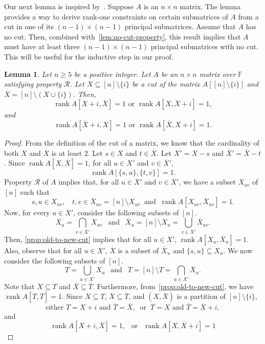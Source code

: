 \documentclass[11pt,letterpaper]{article}
\DeclareMathOperator*{\rank}{rank}
\newcommand{\comp}[1]{\overline{#1}}
\newcommand{\F}{\mathbb{F}}
\newtheorem{lemma}{Lemma}[section]
\newcommand{\nsubset}[1]{[n]\setminus\{#1\}}
\newcommand{\prop}{\mathcal{R}}
\begin{document}
{{{Our next lemma is inspired by~\cite[Lemma~6]{Loewy86}. Suppose $A$ is an $n \times n$ matrix. The lemma provides a way to derive rank-one constraints on certain submatrices of $A$ from a cut in one of its $(n-1) \times (n-1)$ principal submatrices. Assume that $A$ has no cut. Then, combined with~\cref{lem:no-cut-property}, this result implies that $A$ must have at least three $(n-1) \times (n-1)$ principal submatrices with no cut. This will be useful for the inductive step in our proof.
\begin{lemma}
\label{lem:lift-of-cut}
Let $n\geq 5$ be a positive integer. Let $A$ be an $n\times n$ matrix over $\F$ satisfying property $\prop$. Let $X\subseteq [n]\setminus\{i\}$ be a cut of the matrix $A[\nsubset{i}]$ and $\comp{X}=[n]\setminus (X\cup\{i\})$. Then, $$\rank A[X+i,  \comp{X}]=1 \text{ or } \rank A[X,  \comp{X}+i]=1,$$ and $$\rank A[\comp{X}+i,  X]=1 \text{ or } \rank A[\comp{X},  X+i]=1.$$
\end{lemma}
\begin{proof}
From the definition of the cut of a matrix, we know that the cardinality of both $X$ and $\comp{X}$ is at least $2$. Let $s\in X$ and $t\in \comp{X}$. Let $X'=X-s$ and $\comp{X}'=\comp{X}-t$. Since $\rank A[X, \comp{X}]=1$, for all $u\in X'$ and $v\in\comp{X}'$, $$\rank A[\{s, u\}, \{t, v\}]=1.$$ Property $\prop$ of $A$ implies that, for all $u\in X'$ and $v\in\comp{X}'$, we have a subset $X_{uv}$ of $[n]$ such that $$s, u\in X_{uv},\ \ \ \  t, v\in \comp X_{uv}=[n]\setminus X_{uv}\  \text{ and }\ \rank A[X_{uv}, \comp X_{uv}]=1.$$ Now, for every $u\in X'$, consider the following subsets of $[n]$. $$X_u=\bigcap_{v\in \comp{X}'}X_{uv}\ \ \text{ and }\ \ \comp{X}_u=[n]\setminus X_u=\bigcup_{v\in \comp{X}'} \comp{X}_{uv}.$$ Then, \cref{prop:old-to-new-cut} implies that for all $u\in X'$, $\rank A[X_u, \comp{X}_u]=1$. Also, observe that for all $u\in X'$, $\comp{X}$ is a subset of $\comp{X}_u$ and $\{s,u\}\subseteq X_u$. We now consider the following subsets of $[n]$. $$T=\bigcup_{u\in X'}X_u \ \ \text{ and }\ \ \comp{T}=[n]\setminus T=\bigcap_{u\in X'}\comp{X}_u.$$ Note that $X\subseteq T$ and $\comp{X}\subseteq \comp{T}$. Furthermore, from~\cref{prop:old-to-new-cut}, we have $\rank A[T, \comp T]=1$. Since $X\subseteq T$, $\comp{X}\subseteq \comp{T}$, and $(X, \comp{X})$ is a partition of $\nsubset{i}$, $$\text{either } T=X+i \text{ and } \comp{T}=\comp{X},\ \text{ or }\ T=X \text{ and } \comp{T}=\comp{X}+i,$$ and  
\begin{equation}
\label{eqn:lift-of-cut-proof-eqn-1}
\rank A[X+i, \comp{X}]=1,\ \ \text{ or }\ \ \rank A[X, \comp{X}+i]=1
\end{equation}


\end{proof}}}}
\end{document}
